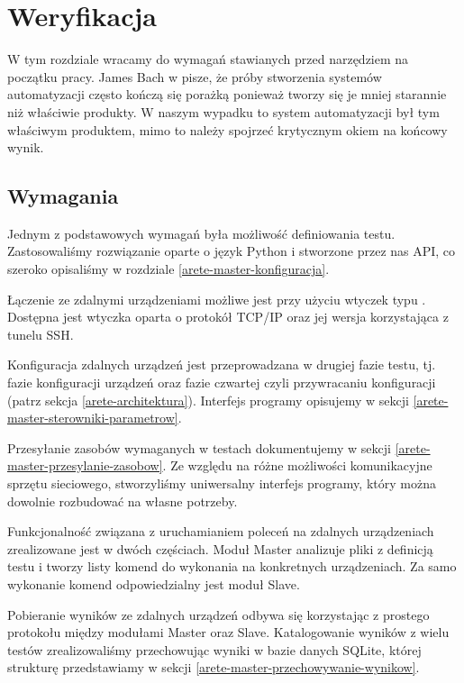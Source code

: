 \documentclass[00-praca-magisterska.tex]{subfiles}
\begin{document}
\chapter{Weryfikacja}
\label{weryfikacja}

W tym rozdziale wracamy do wymagań stawianych przed narzędziem na początku
pracy. James Bach w \cite{snake-oil} pisze, że próby stworzenia systemów
automatyzacji często kończą się porażką ponieważ tworzy się je mniej starannie
niż właściwie produkty. W naszym wypadku to system automatyzacji był tym
właściwym produktem, mimo to należy spojrzeć krytycznym okiem na końcowy wynik.

\section{Wymagania}
\label{wymagania}

Jednym z podstawowych wymagań była możliwość definiowania testu.
Zastosowaliśmy rozwiązanie oparte o język Python i stworzone przez nas API, co
szeroko opisaliśmy w rozdziale \ref{arete-master-konfiguracja}.

Łączenie ze zdalnymi urządzeniami możliwe jest przy użyciu wtyczek typu
. Dostępna jest wtyczka oparta o protokół TCP/IP oraz
jej wersja korzystająca z tunelu SSH.

Konfiguracja zdalnych urządzeń jest przeprowadzana w drugiej fazie testu, tj.
fazie konfiguracji urządzeń oraz fazie czwartej czyli przywracaniu
konfiguracji (patrz sekcja \ref{arete-architektura}). Interfejs programy opisujemy w
sekcji \ref{arete-master-sterowniki-parametrow}.

Przesyłanie zasobów wymaganych w testach dokumentujemy w sekcji
\ref{arete-master-przesylanie-zasobow}. Ze względu na różne możliwości komunikacyjne
sprzętu sieciowego, stworzyliśmy uniwersalny interfejs programy, który można
dowolnie rozbudować na własne potrzeby.

Funkcjonalność związana z uruchamianiem poleceń na zdalnych urządzeniach
zrealizowane jest w dwóch częściach. Moduł Master analizuje pliki z definicją
testu i tworzy listy komend do wykonania na konkretnych urządzeniach. Za samo
wykonanie komend odpowiedzialny jest moduł Slave.

Pobieranie wyników ze zdalnych urządzeń odbywa się korzystając z prostego
protokołu między modułami Master oraz Slave. Katalogowanie wyników z wielu
testów zrealizowaliśmy przechowując wyniki w bazie danych SQLite, której
strukturę przedstawiamy w sekcji \ref{arete-master-przechowywanie-wynikow}.
\end{document}
